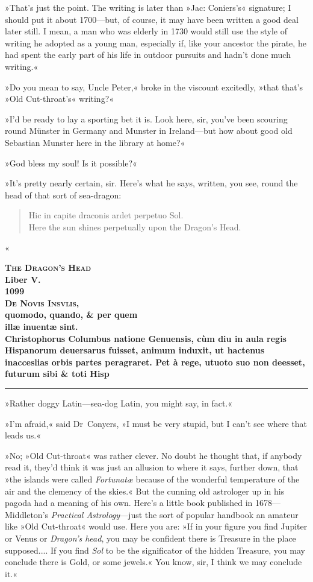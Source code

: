 »That's just the point. The writing is later than »Jac: Coniers's« signature; I should put it about 1700—but, of course, it may have been written a good deal later still. I mean, a man who was elderly in 1730 would still use the style of writing he adopted as a young man, especially if, like your ancestor the pirate, he had spent the early part of his life in outdoor pursuits and hadn't done much writing.«

»Do you mean to say, Uncle Peter,« broke in the viscount excitedly, »that that's »Old Cut-throat's« writing?«

»I'd be ready to lay a sporting bet it is. Look here, sir, you've been scouring round Münster in Germany and Munster in Ireland—but how about good old Sebastian Munster here in the library at home?«

»God bless my soul! Is it possible?«

»It's pretty nearly certain, sir. Here's what he says, written, you see, round the head of that sort of sea-dragon:
\begin{quote}
Hic in capite draconis ardet perpetuo Sol.\\
Here the sun shines perpetually upon the Dragon's Head.
\end{quote}«

\begin{center}\bfseries
\textsc{The Dragon's Head}\\
Liber V.\\
1099\\
\textsc{De Novis Insvlis,}\\
quomodo, quando, \& per quem\\
illæ inuentæ sint.\\
Christophorus Columbus natione Genuensis, cùm diu in aula regis Hispanorum deuersarus fuisset, animum induxit, ut hactenus inacceslias orbis partes peragraret. Pet à rege, utuoto suo non deesset, futurum sibi \& toti Hisp
\end{center}

\noindent\hfil\rule{0.5\textwidth}{.4pt}\hfil 

»Rather doggy Latin—sea-dog Latin, you might say, in fact.«

»I'm afraid,« said Dr~Conyers, »I must be very stupid, but I can't see where that leads us.«

»No; »Old Cut-throat« was rather clever. No doubt he thought that, if anybody read it, they'd think it was just an allusion to where it says, further down, that »the islands were called \textit{Fortunatæ} because of the wonderful temperature of the air and the clemency of the skies.« But the cunning old astrologer up in his pagoda had a meaning of his own. Here's a little book published in 1678—Middleton's \textit{Practical Astrology}—just the sort of popular handbook an amateur like »Old Cut-throat« would use. Here you are: »If in your figure you find Jupiter or Venus or \textit{Dragon's head}, you may be confident there is Treasure in the place supposed.... If you find \textit{Sol} to be the significator of the hidden Treasure, you may conclude there is Gold, or some jewels.« You know, sir, I think we may conclude it.«

